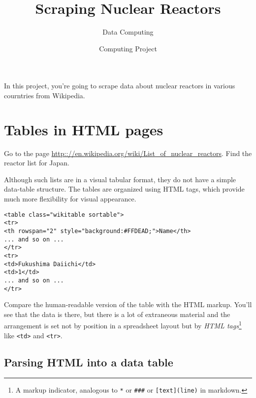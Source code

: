 \documentclass[]{tufte-handout}
\title{Scraping Nuclear Reactors}
\author{Data Computing}
\date{Computing Project}
\newenvironment{Shaded}{}{}
\newcommand{\KeywordTok}[1]{\textcolor[rgb]{0.00,0.44,0.13}{\textbf{{#1}}}}
\newcommand{\DataTypeTok}[1]{\textcolor[rgb]{0.56,0.13,0.00}{{#1}}}
\newcommand{\DecValTok}[1]{\textcolor[rgb]{0.25,0.63,0.44}{{#1}}}
\newcommand{\StringTok}[1]{\textcolor[rgb]{0.25,0.44,0.63}{{#1}}}
\newcommand{\OtherTok}[1]{\textcolor[rgb]{0.00,0.44,0.13}{{#1}}}
\newcommand{\NormalTok}[1]{{#1}}
\begin{document}
\maketitle




In this project, you're going to scrape data about nuclear reactors in
various courntries from Wikipedia.

\section{Tables in HTML pages}\label{tables-in-html-pages}

Go to the page
\url{http:://en.wikipedia.org/wiki/List_of_nuclear_reactors}. Find the
reactor list for Japan.

Although such lists are in a visual tabular format, they do not have a
simple data-table structure. The tables are organized using HTML tags,
which provide much more flexibility for visual appearance.

\begin{verbatim}
<table class="wikitable sortable">
<tr>
<th rowspan="2" style="background:#FFDEAD;">Name</th>
... and so on ...
</tr>
<tr>
<td>Fukushima Daiichi</td>
<td>1</td>
... and so on ...
</tr>
\end{verbatim}

Compare the human-readable version of the table with the HTML markup.
You'll see that the data is there, but there is a lot of extraneous
material and the arrangement is set not by position in a spreadsheet
layout but by \emph{HTML tags}\footnote{A markup indicator, analogous to
  \texttt{*} or \texttt{\#\#\#} or \texttt{{[}text{]}(line)} in
  markdown.} like \texttt{\textless{}td\textgreater{}} and
\texttt{\textless{}tr\textgreater{}}.

\subsection{Parsing HTML into a data
table}\label{parsing-html-into-a-data-table}

\enlargethispage{1in}

\begin{Shaded}
\end{Shaded}
\end{document}
